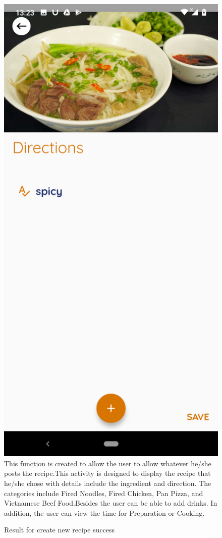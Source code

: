 \documentclass{article}
\begin{document}
\begin{figure}[h!]
    \includegraphics[scale=0.1]{Images/pho_dire.jpg}
    This function is created to allow the user to allow whatever he/she posts the recipe.This activity is designed to display the recipe that he/she chose with details include the ingredient and direction. The categories include Fired Noodles, Fired Chicken, Pan Pizza, and Vietnamese Beef Food.Besides the user can be able to add drinks. In addition, the user can view the time for Preparation or Cooking. 
    \caption{Result for create new recipe success}
    \label{fig:cookingbook}
    \end{figure}
\end{document}
